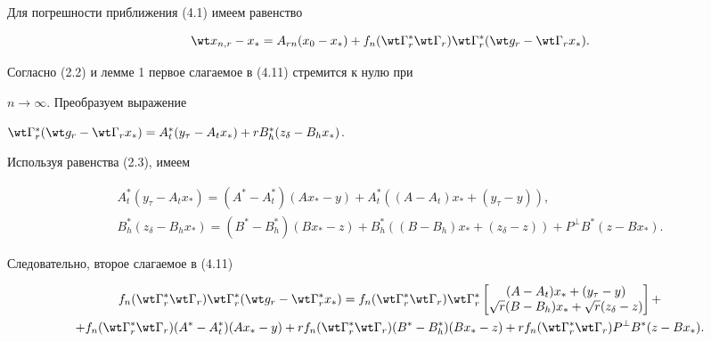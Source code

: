 \begin{pf}


Для погрешности приближения (4.1) имеем равенство


\begin{equation}


\wt x_{n,r}-x_*=A_{rn}(x_0-x_*)+


f_n(\wt \Gamma_r^*\wt \Gamma_r)\wt\Gamma_r^*(\wt g_r-\wt \Gamma_rx_*).


\end{equation}


Согласно (2.2) и лемме 1 первое слагаемое в (4.11) стремится к нулю при 


$n \to \infty$. Преобразуем выражение


$\wt \Gamma_r^*(\wt g_r-\wt \Gamma_r x_*)=A_t^*(y_\tau-A_tx_*)+


rB_h^*(z_\delta-B_hx_*)$.


Используя равенства (2.3), имеем


\begin{gather*}


A_t^*(y_\tau-A_tx_*)=(A^*-A^*_t)(Ax_*-y)+A_t^*((A-A_t)x_*+(y_\tau-y)),\\ 


B_h^*(z_\delta-B_hx_*)=(B^*-B_h^*)(Bx_*-z)+B_h^*((B-B_h)x_*+(z_\delta-z))+


P^\bot B^*(z-Bx_*).


\end{gather*}


Следовательно, второе слагаемое в (4.11)


\begin{gather*}


f_n(\wt \Gamma_r^*\wt \Gamma_r)\wt \Gamma_r^*(\wt g_r-


\wt \Gamma_r^*x_*)=f_n(\wt \Gamma_r^*\wt \Gamma_r)\wt \Gamma_r^*


\begin{bmatrix}(A-A_t)x_*+(y_\tau-y)\\ \sqrt{r}(B-B_h)x_*+\sqrt{r}


(z_\delta-z)\end{bmatrix}+\\


%


+f_n(\wt \Gamma_r^*\wt \Gamma_r)(A^*-A_t^*)(Ax_*-y)+


rf_n(\wt \Gamma_r^*\wt \Gamma_r)(B^*-B_h^*)(Bx_*-z)+


rf_n(\wt \Gamma_r^*\wt \Gamma_r)P^\bot B^*(z-Bx_*).


\end{gather*}



\end{pf}
